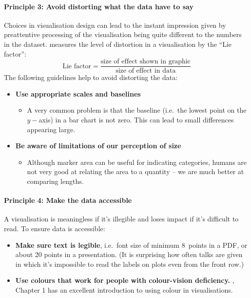 \documentclass[10pt]{article}
\begin{document}
\begin{multicols}{3}
\paragraph{Principle 3: Avoid distorting what the data have to say}

Choices in visualisation design can lead to the instant impression
given by preattentive processing of the visualisation being quite
different to the numbers in the dataset. \citet{Tuft82visu1ed} 
measures the level of distortion in a visualisation by the ``Lie
factor'':
\begin{displaymath}
  \textrm{Lie factor} = \frac{\textrm{size of effect shown in graphic}}{\textrm{size of
  effect in data}}
\end{displaymath}
The following guidelines help to avoid distorting the data:
\begin{itemize}
\item \textbf{Use appropriate scales and baselines}
  \begin{itemize}
  \item A very common problem is that the baseline (i.e.~the lowest
    point on the $y-$axis) in a bar chart is not zero. This can lead to
    small differences appearing large.
  \end{itemize}
\item \textbf{Be aware of limitations of our perception of size}
  \begin{itemize}
  \item Although marker area can be useful for indicating categories,
    humans are not very good at relating the area to a quantity -- we
    are much better at comparing lengths.
  \end{itemize}
\end{itemize}


\paragraph{Principle 4:  Make the data accessible}

A visualisation is meaningless if it's illegible and loses impact if
it's difficult to read. To ensure data is accessible:
\begin{itemize}
\item \textbf{Make sure text is legible}, i.e.~font size of minimum 8~points in
  a PDF, or about 20 points in a presentation. (It is surprising how
  often talks are given in which it's impossible to read the labels on
  plots even from the front row.)
\item \textbf{Use colours that work for people with colour-vision deficiency.}
  \citet{WexlEtal17big}, Chapter 1 has an excellent introduction to
  using colour in visualisations.
\end{itemize}



\end{multicols}
\end{document}
